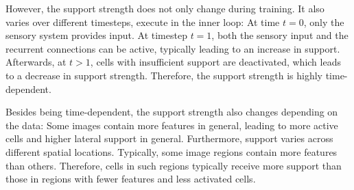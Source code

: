 However, the support strength does not only change during training. It also varies over different timesteps, execute in the inner loop: At time $t=0$, only the sensory system provides input. At timestep $t=1$, both the sensory input and the recurrent connections can be active, typically leading to an increase in support. Afterwards, at $t>1$, cells with insufficient support are deactivated, which leads to a decrease in support strength. Therefore, the support strength is highly time-dependent.

Besides being time-dependent, the support strength also changes depending on the data:
Some images contain more features in general, leading to more active cells and higher lateral support in general. Furthermore, support varies across different spatial locations. Typically, some image regions contain more features than others. Therefore, cells in such regions typically receive more support than those in regions with fewer features and less activated cells.










